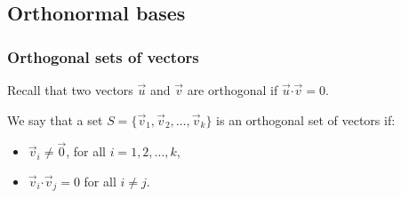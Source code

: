 \documentclass[11pt,t]{beamer}
\newcommand{\dotp}{\boldsymbol{\cdot}}
\begin{document}
\subsection{Orthonormal bases}
\begin{frame}\frametitle{Orthogonal sets of vectors}
 Recall that two vectors $\vec{u}$ and $\vec{v}$ are \alert{orthogonal} if $\vec{u}\dotp\vec{v}=0$.
\begin{definition}
 We say that a set $S=\{\vec{v}_1,\vec{v}_2,\ldots, \vec{v}_k\}$ is an \alert{orthogonal set of vectors} if:
\begin{itemize}
 \item $\vec{v}_i\neq \vec{0}$, for all $i=1,2,\ldots, k$,
 \item $\vec{v}_i\dotp \vec{v}_j = 0$ for all $i\neq j$.
\end{itemize}

\end{definition}
\end{frame}
\end{document}
